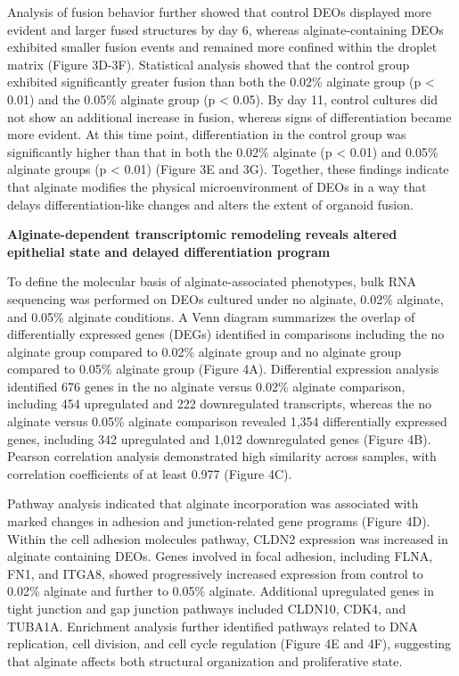 \documentclass[
]{article}
\begin{document}
Analysis of fusion behavior further showed that control DEOs displayed more evident and larger fused structures by day 6, whereas alginate-containing DEOs exhibited smaller fusion events and remained more confined within the droplet matrix (Figure 3D-3F). Statistical analysis showed that the control group exhibited significantly greater fusion than both the 0.02\% alginate group (p \textless{} 0.01) and the 0.05\% alginate group (p \textless{} 0.05). By day 11, control cultures did not show an additional increase in fusion, whereas signs of differentiation became more evident. At this time point, differentiation in the control group was significantly higher than that in both the 0.02\% alginate (p \textless{} 0.01) and 0.05\% alginate groups (p \textless{} 0.01) (Figure 3E and 3G). Together, these findings indicate that alginate modifies the physical microenvironment of DEOs in a way that delays differentiation-like changes and alters the extent of organoid fusion.

\textbf{Alginate-dependent transcriptomic remodeling reveals altered epithelial state and delayed differentiation program}

To define the molecular basis of alginate-associated phenotypes, bulk RNA sequencing was performed on DEOs cultured under no alginate, 0.02\% alginate, and 0.05\% alginate conditions. A Venn diagram summarizes the overlap of differentially expressed genes (DEGs) identified in comparisons including the no alginate group compared to 0.02\% alginate group and no alginate group compared to 0.05\% alginate group (Figure 4A). Differential expression analysis identified 676 genes in the no alginate versus 0.02\% alginate comparison, including 454 upregulated and 222 downregulated transcripts, whereas the no alginate versus 0.05\% alginate comparison revealed 1,354 differentially expressed genes, including 342 upregulated and 1,012 downregulated genes (Figure 4B). Pearson correlation analysis demonstrated high similarity across samples, with correlation coefficients of at least 0.977 (Figure 4C).

Pathway analysis indicated that alginate incorporation was associated with marked changes in adhesion and junction-related gene programs (Figure 4D). Within the cell adhesion molecules pathway, CLDN2 expression was increased in alginate containing DEOs. Genes involved in focal adhesion, including FLNA, FN1, and ITGA8, showed progressively increased expression from control to 0.02\% alginate and further to 0.05\% alginate. Additional upregulated genes in tight junction and gap junction pathways included CLDN10, CDK4, and TUBA1A. Enrichment analysis further identified pathways related to DNA replication, cell division, and cell cycle regulation (Figure 4E and 4F), suggesting that alginate affects both structural organization and proliferative state.
\end{document}
